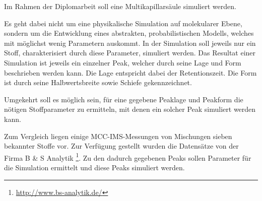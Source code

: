 \documentclass[a4paper,10pt]{article}
\begin{document}
Im Rahmen der Diplomarbeit soll eine Multikapillarsäule simuliert werden. 

Es geht dabei nicht um eine physikalische Simulation auf molekularer Ebene, sondern um die Entwicklung eines abstrakten, probabilistischen Modells, welches mit möglichst wenig Parametern auskommt. %
In der Simulation soll jeweils nur ein Stoff, charakterisiert durch diese Parameter, simuliert werden. Das Resultat einer Simulation ist jeweils ein einzelner Peak, welcher durch seine Lage und Form beschrieben werden kann. Die Lage entspricht dabei der Retentionszeit. Die Form ist durch seine Halbwertsbreite sowie Schiefe gekennzeichnet.

Umgekehrt soll es möglich sein, für eine gegebene Peaklage und Peakform die nötigen Stoffparameter zu ermitteln, mit denen ein solcher Peak simuliert werden kann.

Zum Vergleich liegen %
einige MCC-IMS-Messungen von Mischungen sieben bekannter Stoffe vor. Zur Verfügung gestellt wurden die Datensätze von der Firma B \& S Analytik \footnote{\url{http://www.bs-analytik.de/}}. %
Zu den dadurch gegebenen Peaks sollen Parameter für die Simulation ermittelt und diese Peaks simuliert werden.
\end{document}
